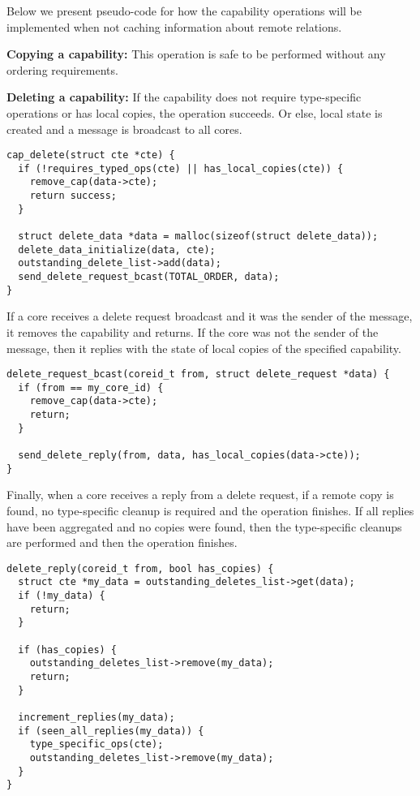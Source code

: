 \documentclass[a4paper,twoside]{report} %
\begin{document}
Below we present pseudo-code for how the capability operations will be
implemented when not caching information about remote relations.

\textbf{Copying a capability:} This operation is safe to be performed
without any ordering requirements.

\textbf{Deleting a capability:} If the capability does not require
type-specific operations or has local copies, the operation succeeds.
Or else, local state is created and a message is broadcast to all
cores.

\begin{verbatim}
cap_delete(struct cte *cte) {
  if (!requires_typed_ops(cte) || has_local_copies(cte)) {
    remove_cap(data->cte);
    return success;
  }

  struct delete_data *data = malloc(sizeof(struct delete_data));
  delete_data_initialize(data, cte);
  outstanding_delete_list->add(data);
  send_delete_request_bcast(TOTAL_ORDER, data);
}
\end{verbatim}

If a core receives a delete request broadcast and it was the sender of
the message, it removes the capability and returns. If the core was
not the sender of the message, then it replies with the state of local
copies of the specified capability.

\begin{verbatim}
delete_request_bcast(coreid_t from, struct delete_request *data) {
  if (from == my_core_id) {
    remove_cap(data->cte);
    return;
  }

  send_delete_reply(from, data, has_local_copies(data->cte));
}
\end{verbatim}

Finally, when a core receives a reply from a delete request, if a
remote copy is found, no type-specific cleanup is required and the
operation finishes. If all replies have been aggregated and no copies
were found, then the type-specific cleanups are performed and then the
operation finishes.

\begin{verbatim}
delete_reply(coreid_t from, bool has_copies) {
  struct cte *my_data = outstanding_deletes_list->get(data);
  if (!my_data) {
    return;
  }

  if (has_copies) {
    outstanding_deletes_list->remove(my_data);
    return;
  }

  increment_replies(my_data);
  if (seen_all_replies(my_data)) {
    type_specific_ops(cte);
    outstanding_deletes_list->remove(my_data);
  }
}
\end{verbatim}
\end{document}

